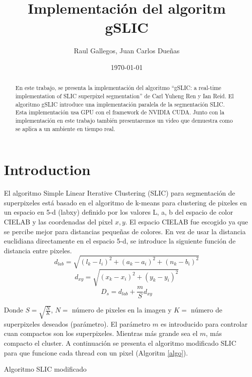 \documentclass[11pt, oneside]{article}   	%
\title{Implementaci\'on del algoritm gSLIC}
\author{Raul Gallegos, Juan Carlos Due\~nas}
\date{\today}							%
\begin{document}
\maketitle
\begin{abstract}
En este trabajo, se presenta la implementaci\'on del algoritmo ``gSLIC: a real-time implementation of SLIC superpixel segmentation'' de Carl Yuheng Ren y Ian Reid\cite{YHRen_gSLIC}.
El algoritmo gSLIC introduce una implementaci\'on paralela de la segmentaci\'on SLIC. Esta implementaci\'on usa GPU con el framework de NVIDIA CUDA. Junto con la implementaci\'on en este trabajo tambi\'en presentaremos un video que demuestra como se aplica a un ambiente en tiempo real. 
\end{abstract}

\section{Introduction}
El algoritmo Simple Linear Iterative Clustering (SLIC) para segmentaci\'on de superpixeles est\'a basado en el algoritmo de k-means para clustering de pixeles en un espacio en 5-d (labxy) definido por los valores L, a, b del espacio de color CIELAB y las coordenadas del pixel $x,y$. El espacio CIELAB fue escogido ya que se percibe mejor para distancias pequeñas de colores. En vez de usar la distancia euclidiana directamente en el espacio 5-d, se introduce la siguiente función de distancia entre pixeles.
$$
d_{lab}=\sqrt{(l_k-l_i)^2+(a_k-a_i)^2+(n_k-b_i)^2}
$$
$$
d_{xy}=\sqrt{(x_k-x_i)^2+(y_k-y_i)^2}
$$
$$
D_s=d_{lab}+\frac{m}{S}d_{xy}
$$

Donde $S = \sqrt{\frac{N}{K}}$, $N=$ n\'umero de pixeles en la imagen y $K=$ n\'umero de superpixeles deseados (par\'ametro). El par\'ametro $m$ es introducido para controlar cuan compactos son los superpixeles. Mientras m\'as grande sea el $m$, m\'as compacto el cluster. A continuaci\'on se presenta el algoritmo modificado SLIC para que funcione cada thread con un pixel (Algoritm \ref{algo}).
\begin{algorithm}
\caption{Algoritmo SLIC modificado}
\label{algo}
\begin{algorithmic}[1]
\EndFor
{}
\EndFor
{}
\EndWhile
{}
\end{algorithmic}
\end{algorithm}
\end{document}
